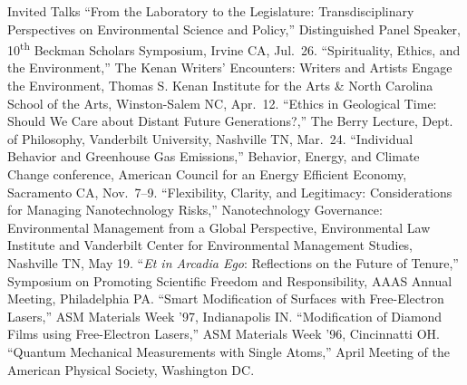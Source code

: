 \begin{rubric}{Invited Talks}
\entry*[2008]``From the Laboratory to the Legislature: Transdisciplinary Perspectives on Environmental Science and Policy,'' Distinguished Panel Speaker, 10\textsuperscript{th} Beckman Scholars Symposium, Irvine CA, Jul.~26.
\entry*[2008]``Spirituality, Ethics, and the Environment,'' The Kenan Writers' Encounters: Writers and Artists Engage the Environment, Thomas S. Kenan Institute for the Arts \& North Carolina School of the Arts, Winston-Salem NC, Apr.~12.
\entry*[2008]``Ethics in Geological Time: Should We Care about Distant Future Generations?,'' The Berry Lecture, Dept. of Philosophy, Vanderbilt University, Nashville TN, Mar.~24.
\entry*[2007]``Individual Behavior and Greenhouse Gas Emissions,'' Behavior, Energy, and Climate Change conference, 
American Council for an Energy Efficient Economy, Sacramento CA, Nov.~7--9.
\entry*[2006]``Flexibility, Clarity, and Legitimacy: Considerations for Managing Nanotechnology Risks,'' Nanotechnology Governance: Environmental Management from a Global Perspective, Environmental Law Institute and Vanderbilt Center for Environmental Management Studies, Nashville TN, May 19.
\entry*[1998\phantom{--1998}]``\emph{Et in Arcadia Ego}: Reflections on the Future of Tenure,'' Symposium on Promoting Scientific Freedom and Responsibility,
AAAS Annual Meeting, Philadelphia PA.
\entry*[1997]``Smart Modification of Surfaces with Free-Electron Lasers,'' ASM Materials Week '97, Indianapolis IN.
\entry*[1996]``Modification of Diamond Films using Free-Electron Lasers,'' ASM Materials Week '96, Cincinnatti OH.
\entry*[1992]``Quantum Mechanical Measurements with Single Atoms,'' April Meeting of the American Physical Society, Washington DC.
\end{rubric}
